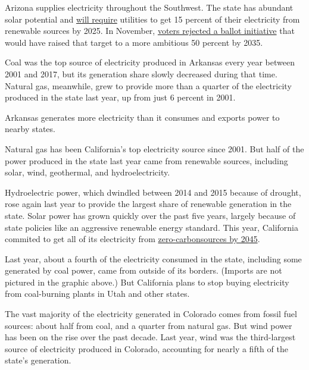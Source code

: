 Arizona supplies electricity throughout the Southwest. The state has
abundant solar potential and
\href{https://www.energy.gov/savings/renewable-energy-standard-0}{will
require} utilities to get 15 percent of their electricity from renewable
sources by 2025. In November,
\href{https://www.nytimes3xbfgragh.onion/2018/11/07/climate/climate-change-midterm-elections.html}{voters
rejected a ballot initiative} that would have raised that target to a
more ambitious 50 percent by 2035.

Coal was the top source of electricity produced in Arkansas every year
between 2001 and 2017, but its generation share slowly decreased during
that time. Natural gas, meanwhile, grew to provide more than a quarter
of the electricity produced in the state last year, up from just 6
percent in 2001.

Arkansas generates more electricity than it consumes and exports power
to nearby states.

Natural gas has been California's top electricity source since 2001. But
half of the power produced in the state last year came from renewable
sources, including solar, wind, geothermal, and hydroelectricity.

Hydroelectric power, which dwindled between 2014 and 2015 because of
drought, rose again last year to provide the largest share of renewable
generation in the state. Solar power has grown quickly over the past
five years, largely because of state policies like an aggressive
renewable energy standard. This year, California commited to get all of
its electricity from
\href{https://www.nytimes3xbfgragh.onion/2018/08/28/business/energy-environment/california-clean-energy.html}{zero-carbon}\href{https://www.nytimes3xbfgragh.onion/2018/08/28/business/energy-environment/california-clean-energy.html}{sources
by 2045}.

Last year, about a fourth of the electricity consumed in the state,
including some generated by coal power, came from outside of its
borders. (Imports are not pictured in the graphic above.) But California
plans to stop buying electricity from coal-burning plants in Utah and
other states.

The vast majority of the electricity generated in Colorado comes from
fossil fuel sources: about half from coal, and a quarter from natural
gas. But wind power has been on the rise over the past decade. Last
year, wind was the third-largest source of electricity produced in
Colorado, accounting for nearly a fifth of the state's generation.

